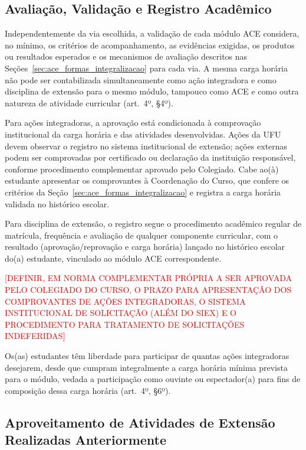 \subsection{Avaliação, Validação e Registro Acadêmico}
\label{sec:ace_avaliacao_registro}

Independentemente da via escolhida, a validação de cada módulo ACE considera, no mínimo, os critérios de acompanhamento, as evidências exigidas, os produtos ou resultados esperados e os mecanismos de avaliação descritos nas Seções~\ref{sec:ace_formas_integralizacao} para cada via. A mesma carga horária não pode ser contabilizada simultaneamente como ação integradora e como disciplina de extensão para o mesmo módulo, tampouco como ACE e como outra natureza de atividade curricular (art.\ 4º, §4º).

Para ações integradoras, a aprovação está condicionada à comprovação institucional da carga horária e das atividades desenvolvidas. Ações da UFU devem observar o registro no sistema institucional de extensão; ações externas podem ser comprovadas por certificado ou declaração da instituição responsável, conforme procedimento complementar aprovado pelo Colegiado. Cabe ao(à) estudante apresentar os comprovantes à Coordenação do Curso, que confere os critérios da Seção~\ref{sec:ace_formas_integralizacao} e registra a carga horária validada no histórico escolar.

Para disciplina de extensão, o registro segue o procedimento acadêmico regular de matrícula, frequência e avaliação de qualquer componente curricular, com o resultado (aprovação/reprovação e carga horária) lançado no histórico escolar do(a) estudante, vinculado ao módulo ACE correspondente.

\textcolor{red}{[DEFINIR, EM NORMA COMPLEMENTAR PRÓPRIA A SER APROVADA PELO COLEGIADO DO CURSO, O PRAZO PARA APRESENTAÇÃO DOS COMPROVANTES DE AÇÕES INTEGRADORAS, O SISTEMA INSTITUCIONAL DE SOLICITAÇÃO (ALÉM DO SIEX) E O PROCEDIMENTO PARA TRATAMENTO DE SOLICITAÇÕES INDEFERIDAS]}

Os(as) estudantes têm liberdade para participar de quantas ações integradoras desejarem, desde que cumpram integralmente a carga horária mínima prevista para o módulo, vedada a participação como ouvinte ou espectador(a) para fins de composição dessa carga horária (art.\ 4º, §6º).

\subsection{Aproveitamento de Atividades de Extensão Realizadas Anteriormente}
\label{sec:ace_aproveitamento}

